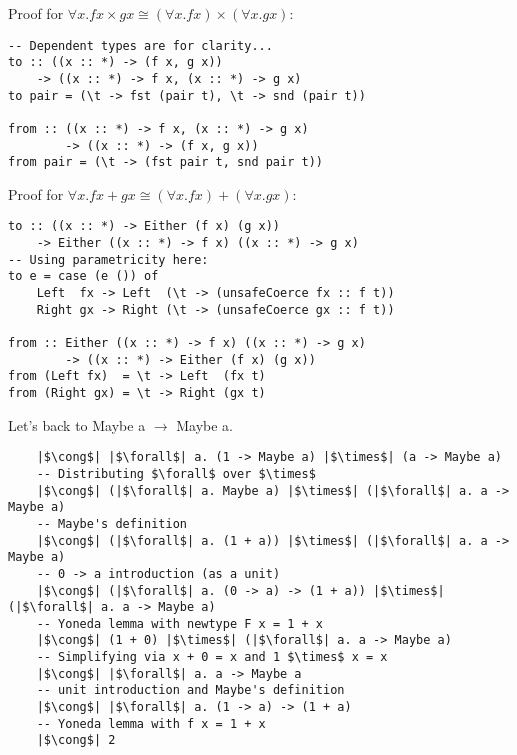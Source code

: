 \documentclass[tikz]{beamer}
\theoremstyle{definition}
\begin{document}
\begin{frame}[fragile]
Proof for $\forall x. f x \times g x \cong (\forall x. f x) \times (\forall x. g x)$:
\begin{verbatim}
-- Dependent types are for clarity...
to :: ((x :: *) -> (f x, g x))
    -> ((x :: *) -> f x, (x :: *) -> g x)
to pair = (\t -> fst (pair t), \t -> snd (pair t))

from :: ((x :: *) -> f x, (x :: *) -> g x)
        -> ((x :: *) -> (f x, g x))
from pair = (\t -> (fst pair t, snd pair t))
\end{verbatim}
\end{frame}

\begin{frame}[fragile]
Proof for $\forall x. f x + g x \cong (\forall x. f x) + (\forall x. g x)$:
\begin{verbatim}
to :: ((x :: *) -> Either (f x) (g x))
    -> Either ((x :: *) -> f x) ((x :: *) -> g x)
-- Using parametricity here:
to e = case (e ()) of
    Left  fx -> Left  (\t -> (unsafeCoerce fx :: f t))
    Right gx -> Right (\t -> (unsafeCoerce gx :: f t))

from :: Either ((x :: *) -> f x) ((x :: *) -> g x)
        -> ((x :: *) -> Either (f x) (g x))
from (Left fx)  = \t -> Left  (fx t)
from (Right gx) = \t -> Right (gx t)
\end{verbatim}
\end{frame}

\begin{frame}[fragile]
Let's back to Maybe a $\rightarrow$ Maybe a.
\begin{verbatim}
    |$\cong$| |$\forall$| a. (1 -> Maybe a) |$\times$| (a -> Maybe a)
    -- Distributing $\forall$ over $\times$
    |$\cong$| (|$\forall$| a. Maybe a) |$\times$| (|$\forall$| a. a -> Maybe a)
    -- Maybe's definition
    |$\cong$| (|$\forall$| a. (1 + a)) |$\times$| (|$\forall$| a. a -> Maybe a)
    -- 0 -> a introduction (as a unit)
    |$\cong$| (|$\forall$| a. (0 -> a) -> (1 + a)) |$\times$| (|$\forall$| a. a -> Maybe a)
    -- Yoneda lemma with newtype F x = 1 + x
    |$\cong$| (1 + 0) |$\times$| (|$\forall$| a. a -> Maybe a)
    -- Simplifying via x + 0 = x and 1 $\times$ x = x
    |$\cong$| |$\forall$| a. a -> Maybe a
    -- unit introduction and Maybe's definition
    |$\cong$| |$\forall$| a. (1 -> a) -> (1 + a)
    -- Yoneda lemma with f x = 1 + x
    |$\cong$| 2
\end{verbatim}
\end{frame}
\end{document}
